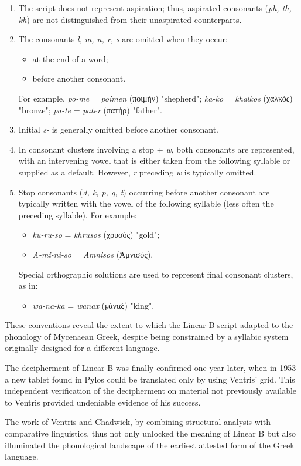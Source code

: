 \begin{enumerate}
\item The script does not represent aspiration; thus, aspirated consonants (\textit{ph, th, kh}) are not distinguished from their unaspirated counterparts.

\item The consonants \textit{l, m, n, r, s} are omitted when they occur:
\begin{itemize}
    \item at the end of a word;
    \item before another consonant.
\end{itemize}
For example, \textit{po-me} = \textit{poimen} (\textgreek{ποιμήν}) "shepherd"; \textit{ka-ko} = \textit{khalkos} (\textgreek{χαλκός}) "bronze"; \textit{pa-te} = \textit{pater} (\textgreek{πατήρ}) "father".

\item Initial \textit{s-} is generally omitted before another consonant.

\item In consonant clusters involving a stop + \textit{w}, both consonants are represented, with an intervening vowel that is either taken from the following syllable or supplied as a default. However, \textit{r} preceding \textit{w} is typically omitted.

\item Stop consonants (\textit{d, k, p, q, t}) occurring before another consonant are typically written with the vowel of the following syllable (less often the preceding syllable). 
For example:
\begin{itemize}
    \item \textit{ku-ru-so} = \textit{khrusos} (\textgreek{χρυσός}) "gold";
    \item \textit{A-mi-ni-so} = \textit{Amnisos} (\textgreek{Ἀμνισός}).
\end{itemize}
Special orthographic solutions are used to represent final consonant clusters, as in:
\begin{itemize}
    \item \textit{wa-na-ka} = \textit{wanax} (\textgreek{ϝάναξ}) "king".
\end{itemize}
\end{enumerate}

These conventions reveal the extent to which the Linear B script adapted to the phonology of Mycenaean Greek, despite being constrained by a syllabic system originally designed for a different language. \cite{chad-ch5}

The decipherment of Linear B was finally confirmed one year later, when in 1953 a new tablet found in Pylos could be translated only by using Ventris' grid.
This independent verification of the decipherment on material not previously available to Ventris provided undeniable evidence of his success. \cite{chad-ch6}

The work of Ventris and Chadwick, by combining structural analysis with comparative linguistics, thus not only unlocked the meaning of Linear B but also illuminated the phonological landscape of the earliest attested form of the Greek language.